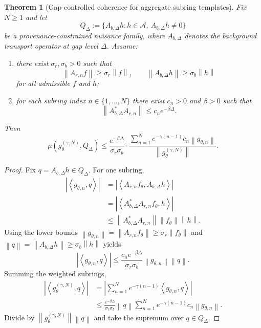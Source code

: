 \documentclass[11pt,a4paper]{article}
\newtheorem{theorem}{Theorem}
\theoremstyle{definition}
\theoremstyle{remark}
\newcommand{\inner}[2]{\left\langle #1, #2 \right\rangle}
\newcommand{\norm}[1]{\left\lVert #1 \right\rVert}
\newcommand{\abs}[1]{\left\lvert #1 \right\rvert}
\begin{document}
\begin{theorem}[Gap-controlled coherence for aggregate subring templates]
\label{thm:gap-bound}
Fix $N\ge1$ and let
\[
Q_\Delta := \{A_{b,\Delta}h : h\in\mathcal A,\ A_{b,\Delta}h\neq0\}
\]
be a provenance-constrained nuisance family, where $A_{b,\Delta}$ denotes the background transport operator at gap level $\Delta$. Assume:
\begin{enumerate}[label=(\roman*),leftmargin=1.6em,itemsep=0.15em,topsep=0.2em]
\item there exist $\sigma_r,\sigma_b>0$ such that
\[
\norm{A_{r,n}f}\ge \sigma_r \norm{f},
\qquad
\norm{A_{b,\Delta}h}\ge \sigma_b \norm{h}
\]
for all admissible $f$ and $h$;
\item for each subring index $n\in\{1,\dots,N\}$ there exist $c_n>0$ and $\beta>0$ such that
\[
\norm{A_{b,\Delta}^{*}A_{r,n}} \le c_n e^{-\beta\Delta}.
\]
\end{enumerate}
Then
\begin{equation}
\mu\!\left(g_{\theta}^{(\gamma,N)},Q_\Delta\right)
\le
\frac{e^{-\beta\Delta}}{\sigma_r\sigma_b}
\cdot
\frac{\sum_{n=1}^{N} e^{-\gamma(n-1)} c_n \norm{g_{\theta,n}}}
{\norm{g_{\theta}^{(\gamma,N)}}}.
\label{eq:main-bound}
\end{equation}
\end{theorem}

\begin{proof}
Fix $q=A_{b,\Delta}h\in Q_\Delta$. For one subring,
\[
\begin{aligned}
\abs{\inner{g_{\theta,n}}{q}}
&=
\abs{\inner{A_{r,n}f_\theta}{A_{b,\Delta}h}} \\
&=
\abs{\inner{A_{b,\Delta}^{*}A_{r,n}f_\theta}{h}} \\
&\le
\norm{A_{b,\Delta}^{*}A_{r,n}} \norm{f_\theta}\norm{h}.
\end{aligned}
\]
Using the lower bounds $\norm{g_{\theta,n}}=\norm{A_{r,n}f_\theta}\ge \sigma_r \norm{f_\theta}$ and $\norm{q}=\norm{A_{b,\Delta}h}\ge \sigma_b \norm{h}$ yields
\[
\abs{\inner{g_{\theta,n}}{q}}
\le
\frac{c_n e^{-\beta\Delta}}{\sigma_r\sigma_b}
\norm{g_{\theta,n}}\norm{q}.
\]
Summing the weighted subrings,
\[
\begin{aligned}
\abs{\inner{g_{\theta}^{(\gamma,N)}}{q}}
&=
\left|
\sum_{n=1}^{N} e^{-\gamma(n-1)} \inner{g_{\theta,n}}{q}
\right| \\
&\le
\frac{e^{-\beta\Delta}}{\sigma_r\sigma_b}
\norm{q}
\sum_{n=1}^{N} e^{-\gamma(n-1)} c_n \norm{g_{\theta,n}}.
\end{aligned}
\]
Divide by $\norm{g_{\theta}^{(\gamma,N)}}\norm{q}$ and take the supremum over $q\in Q_\Delta$.
\end{proof}
\end{document}
